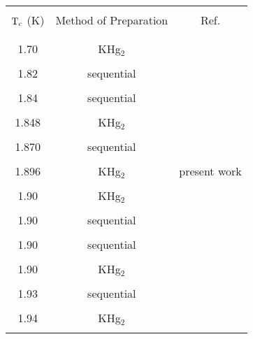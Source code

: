 \setcounter{chapter}{2}
{\newpage
\clearpage
\samepage \begin{figure}\vspace{8in}

\label{phasediag}
\end{figure}
}

{\newpage
\clearpage
\samepage \begin{figure}\vspace{7in}

\label{alloychoice}
\end{figure}
}

{\newpage
\clearpage
\samepage \begin{table}
\label{stiitc}
\begin{center}
\begin{tabular}{||c|c|c||}
\hline
& & \\ 
$\rm T_c$ (K) & Method of Preparation & Ref.\\ 
& & \\ 
\hline
& & \\ 
1.70 & KHg$_2$  & \cite{koike81}\\ 
& & \\ 
1.82&  sequential  & \cite{iye83}\\ 
& & \\ 
1.84 & sequential  & \cite{iye83}\\ 
& & \\ 
1.848 & KHg$_2$ & \cite{delong82a} \\ 
& & \\ 
1.870 & sequential & \cite{delong82a} \\ 
& & \\ 
1.896 & KHg$_2$ & present work \\ 
& & \\ 
1.90 & KHg$_2$  & \cite{koike81}\\  
& & \\ 
1.90 & sequential   & \cite{vogel81}\\ 
& & \\ 
1.90 & sequential  & \cite{pendrys81} \\ 
& & \\ 
1.90 & KHg$_2$  & \cite{tanuma81} \\ 
& & \\ 
1.93 & sequential  & \cite{alexander81} \\ 
& & \\ 
1.94 & KHg$_2$  & \cite{tanuma81} \\ 
& & \\ 
\hline
\end{tabular}
\end{center}
\end{table}
}

